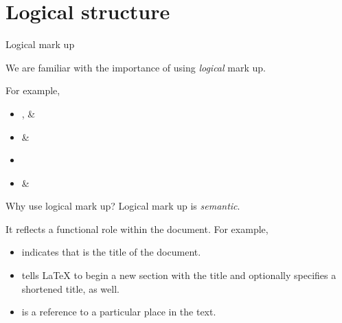 \overleaf

\section{Logical structure}

\begin{frame}[fragile]{Logical mark up}

  We are familiar with the importance of using \emph{logical} mark up.

  For example,
  \begin{itemize}
	\item {},  \& 
	\item {} \& 
	\item {}
	\item {} \& 
  \end{itemize}

\end{frame}

\begin{frame}[fragile]{Why use logical mark up?}
  Logical mark up is \emph{semantic}.

  It reflects a functional role within the document.
  For example,
  \begin{itemize}
	\item {} indicates that  is the title of the document.
	\item {} tells \LaTeX{} to begin a new section with the title  and optionally specifies a shortened title,  as well.
	\item {} is a reference to a particular place in the text.
  \end{itemize}

\end{frame}

